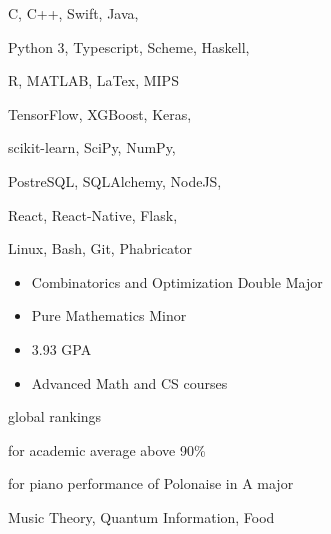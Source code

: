C, C++, Swift, Java,
\smallskip

Python 3, Typescript, Scheme, Haskell,
\smallskip

R, MATLAB, LaTex, MIPS

\divider\smallskip

TensorFlow, XGBoost, Keras,
\smallskip

scikit-learn, SciPy, NumPy,
\smallskip

PostreSQL, SQLAlchemy, NodeJS,
\smallskip

React, React-Native, Flask,

\divider\smallskip

Linux, Bash, Git, Phabricator


\begin{itemize}
    \item Combinatorics and Optimization Double Major
    \item Pure Mathematics Minor
    \item 3.93 GPA
    \item Advanced Math and CS courses
\end{itemize}


global rankings

\divider\smallskip

for academic average above 90\%

\divider\smallskip

for piano performance of Polonaise in A major

\divider\smallskip


Music Theory, Quantum Information, Food
